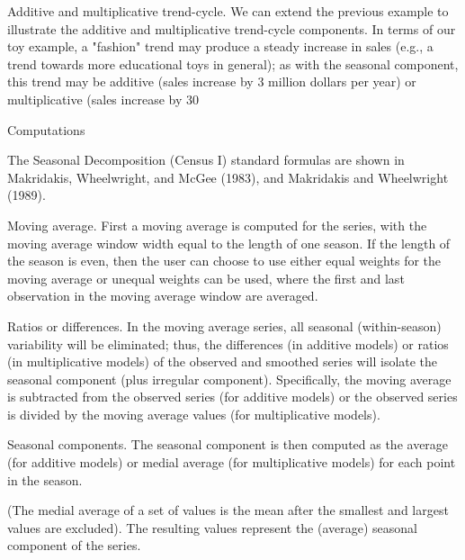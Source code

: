 Additive and multiplicative trend-cycle. We can extend the previous example to illustrate the additive and multiplicative trend-cycle components. In terms of our toy example, a "fashion" trend may produce a steady increase in sales (e.g., a trend towards more educational toys in general); as with the seasonal component, this trend may be additive (sales increase by 3 million dollars per year) or multiplicative (sales increase by 30%

Computations

The Seasonal Decomposition (Census I) standard formulas are shown in Makridakis, Wheelwright, and McGee (1983), and Makridakis and Wheelwright (1989).



Moving average. First a moving average is computed for the series, with the moving average window width equal to the length of one season. If the length of the season is even, then the user can choose to use either equal weights for the moving average or unequal weights can be used, where the first and last observation in the moving average window are averaged.

Ratios or differences. In the moving average series, all seasonal (within-season) variability will be eliminated; thus, the differences (in additive models) or ratios (in multiplicative models) of the observed and smoothed series will isolate the seasonal component (plus irregular component). Specifically, the moving average is subtracted from the observed series (for additive models) or the observed series is divided by the moving average values (for multiplicative models).

Seasonal components. The seasonal component is then computed as the average (for additive models) or medial average (for multiplicative models) for each point in the season.



(The medial average of a set of values is the mean after the smallest and largest values are excluded). The resulting values represent the (average) seasonal component of the series.

